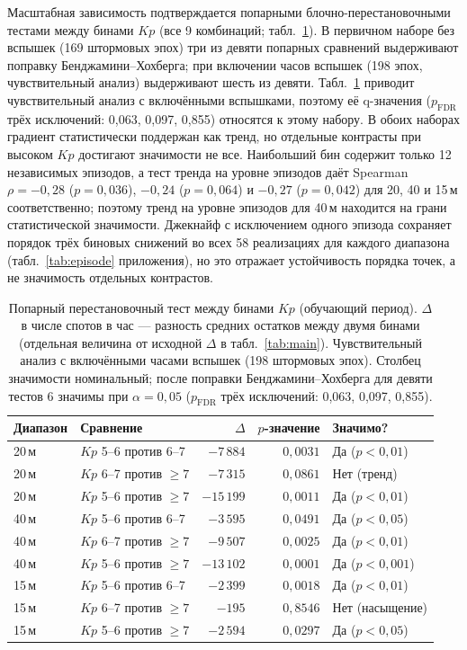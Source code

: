 \documentclass{agujournal2019}
\begin{document}
Масштабная зависимость подтверждается попарными блочно-перестановочными
тестами между бинами $Kp$ (все 9 комбинаций; табл.~\ref{tab:pairwise}).
В первичном наборе без вспышек (169 штормовых эпох) три из девяти
попарных сравнений выдерживают поправку Бенджамини--Хохберга; при
включении часов вспышек (198 эпох, чувствительный анализ) выдерживают
шесть из девяти. Табл.~\ref{tab:pairwise} приводит чувствительный анализ
с включёнными вспышками, поэтому её q-значения ($p_{\text{FDR}}$
трёх исключений: 0,063, 0,097, 0,855) относятся к этому набору.
В обоих наборах градиент статистически поддержан как тренд, но отдельные
контрасты при высоком $Kp$ достигают значимости не все. Наибольший бин содержит только 12
независимых эпизодов, а тест тренда на уровне эпизодов даёт Spearman
$\rho = -0{,}28$ ($p = 0{,}036$), $-0{,}24$ ($p = 0{,}064$) и $-0{,}27$
($p = 0{,}042$) для 20, 40 и 15\,м соответственно; поэтому тренд на уровне эпизодов для 40\,м находится на грани статистической значимости. Джекнайф с исключением одного эпизода
сохраняет порядок трёх биновых снижений во всех 58 реализациях для каждого
диапазона (табл.~\ref{tab:episode} приложения), но это отражает
устойчивость порядка точек, а не значимость отдельных контрастов.

\begin{table}[h]
	\centering
	\small
	\setlength{\tabcolsep}{4pt}
	\caption{Попарный перестановочный тест между бинами $Kp$
		(обучающий период). $\Delta$ в числе спотов в час — разность средних
		остатков между двумя бинами (отдельная величина от исходной $\Delta$
		в табл.~\ref{tab:main}). Чувствительный анализ с включёнными часами
		вспышек (198 штормовых эпох). Столбец значимости номинальный; после
		поправки Бенджамини--Хохберга для девяти тестов 6 значимы при
		$\alpha = 0{,}05$ ($p_{\text{FDR}}$ трёх исключений: 0,063,
		0,097, 0,855).}
	\label{tab:pairwise}
	\begin{tabular}{llrrl}
		\toprule
		Диапазон  & Сравнение        & $\Delta$   & $p$-значение & Значимо?      \\
		\midrule
		20\,м & $Kp$ 5--6 против 6--7 & $-7\,884$  & $0{,}0031$  & Да ($p < 0{,}01$)  \\
		20\,м & $Kp$ 6--7 против $\ge 7$ & $-7\,315$  & $0{,}0861$  & Нет (тренд)        \\
		20\,м & $Kp$ 5--6 против $\ge 7$ & $-15\,199$ & $0{,}0011$  & Да ($p < 0{,}01$)  \\
		40\,м & $Kp$ 5--6 против 6--7 & $-3\,595$  & $0{,}0491$  & Да ($p < 0{,}05$)  \\
		40\,м & $Kp$ 6--7 против $\ge 7$ & $-9\,507$  & $0{,}0025$  & Да ($p < 0{,}01$)  \\
		40\,м & $Kp$ 5--6 против $\ge 7$ & $-13\,102$ & $0{,}0001$  & Да ($p < 0{,}001$) \\
		15\,м & $Kp$ 5--6 против 6--7 & $-2\,399$  & $0{,}0018$  & Да ($p < 0{,}01$)  \\
		15\,м & $Kp$ 6--7 против $\ge 7$ & $-195$     & $0{,}8546$  & Нет (насыщение)   \\
		15\,м & $Kp$ 5--6 против $\ge 7$ & $-2\,594$  & $0{,}0297$  & Да ($p < 0{,}05$)  \\
		\bottomrule
	\end{tabular}
\end{table}
\end{document}
